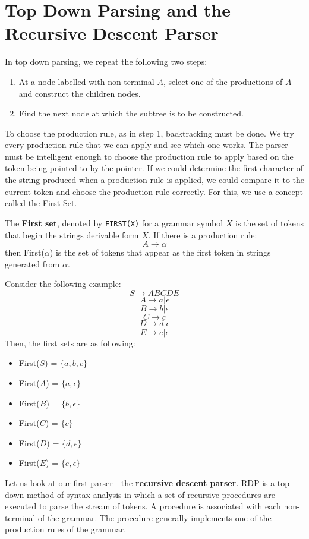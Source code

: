 \documentclass[12pt,letterpaper]{amsbook}
\theoremstyle{definition}
\begin{document}
\section{Top Down Parsing and the Recursive Descent Parser}

In top down parsing, we repeat the following two steps:

\begin{enumerate}
  \item At a node labelled with non-terminal $A$, select one of the productions of $A$ and construct the children nodes.
  \item Find the next node at which the subtree is to be constructed.
\end{enumerate}

To choose the production rule, as in step 1, backtracking must be done. We try every production rule that we can apply and see which one works. The parser must be intelligent enough to choose the production rule to apply based on the token being pointed to by the pointer. If we could determine the first character of the string produced when a production rule is applied, we could compare it to the current token and choose the production rule correctly. For this, we use a concept called the First Set.

The \textbf{First set}, denoted by \texttt{FIRST(X)} for a grammar symbol $X$ is the set of tokens that begin the strings derivable form $X$. If there is a production rule:
\[A \rightarrow \alpha\]
then First($\alpha$) is the set of tokens that appear as the first token in strings generated from $\alpha$.

Consider the following example:
\[S \rightarrow ABCDE\]
\[A \rightarrow a|\epsilon\]
\[B \rightarrow b|\epsilon\]
\[C \rightarrow c\]
\[D \rightarrow d|\epsilon\]
\[E \rightarrow e|\epsilon\]
Then, the first sets are as following:
\begin{itemize}
  \item First($S$) = $\{a,b,c\}$
  \item First($A$) = $\{a,\epsilon\}$
  \item First($B$) = $\{b,\epsilon\}$
  \item First($C$) = $\{c\}$
  \item First($D$) = $\{d,\epsilon\}$
  \item First($E$) = $\{e,\epsilon\}$
\end{itemize}

Let us look at our first parser - the \textbf{recursive descent parser}. RDP is a top down method of syntax analysis in which a set of recursive procedures are executed to parse the stream of tokens. A procedure is associated with each non-terminal of the grammar. The procedure generally implements one of the production rules of the grammar.
\end{document}
